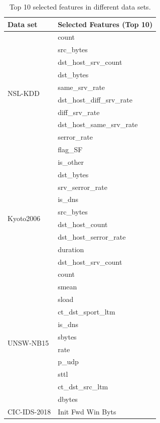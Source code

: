 \documentclass{ieeeaccess}
\theoremstyle{definition}
\begin{document}
\begin{table}[htbp]
    \centering
    \caption{Top 10 selected features in different data sets. }
    \begin{tabular}{ll}
        \toprule
        \multicolumn{1}{l}{Data set} & Selected Features (Top 10) \\
        \midrule
        \multirow{10}[0]{*}{NSL-KDD} & count  \\
            & src\_bytes  \\
            & dst\_host\_srv\_count  \\
            & dst\_bytes \\
            & same\_srv\_rate  \\
            & dst\_host\_diff\_srv\_rate  \\
            & diff\_srv\_rate \\
            & dst\_host\_same\_srv\_rate  \\
            & serror\_rate  \\
            & flag\_SF \\
        \hline
        \multirow{10}[0]{*}{Kyoto2006} & is\_other \\
            & dst\_bytes  \\
            & srv\_serror\_rate  \\
            & is\_dns  \\
            & src\_bytes \\
            & dst\_host\_count  \\
            & dst\_host\_serror\_rate  \\
            & duration \\
            & dst\_host\_srv\_count  \\
            & count \\
        \hline
        \multirow{10}[0]{*}{UNSW-NB15} & smean \\
            & sload \\
            & ct\_dst\_sport\_ltm \\
            & is\_dns \\
            & sbytes \\
            & rate \\
            & p\_udp \\
            & sttl \\
            & ct\_dst\_src\_ltm \\
            & dbytes \\
        \hline
        \multirow{9}[0]{*}{CIC-IDS-2018} & Init Fwd Win Byts \\

\end{tabular}
\end{table}
\end{document}

